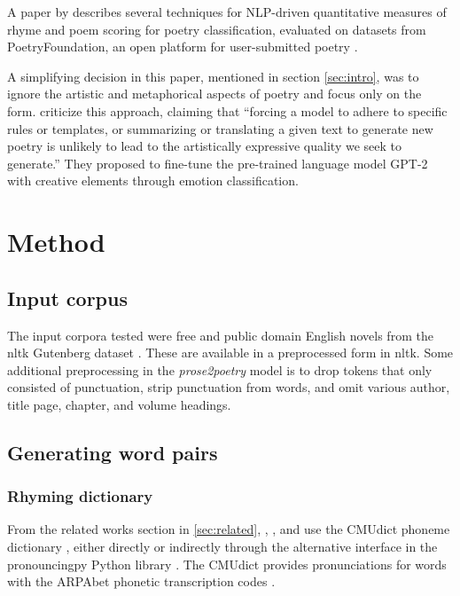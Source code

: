 \documentclass[11pt,a4paper]{article}
\begin{document}
A paper by \citet{keswarani} describes several techniques for NLP-driven quantitative measures of rhyme and poem scoring for poetry classification, evaluated on datasets from PoetryFoundation, an open platform for user-submitted poetry \cite*{poetryfoundation}.

A simplifying decision in this paper, mentioned in section \ref{sec:intro}, was to ignore the artistic and metaphorical aspects of poetry and focus only on the form. \citet{bena2020introducing} criticize this approach, claiming that ``forcing a model to adhere to specific rules or templates, or summarizing or translating a given text to generate new poetry is unlikely to lead to the artistically expressive quality we seek to generate.'' They proposed to fine-tune the pre-trained language model GPT-2 with creative elements through emotion classification.

\section{Method}
\label{sec:method}

\subsection{Input corpus}

The input corpora tested were free and public domain English novels from the nltk Gutenberg dataset \cite[Chapter~2]{gutenbergnltk}. These are available in a preprocessed form in nltk. Some additional preprocessing in the \textit{prose2poetry} model is to drop tokens that only consisted of punctuation, strip punctuation from words, and omit various author, title page, chapter, and volume headings.

\subsection{Generating word pairs}

\subsubsection{Rhyming dictionary}

From the related works section in \ref{sec:related}, \citet{keswarani}, \citet{cole}, and \citet{hopkins-kiela-2017} use the CMUdict phoneme dictionary \cite{cmudict}, either directly or indirectly through the alternative interface in the pronouncingpy Python library \cite{pronouncingpy}. The CMUdict provides pronunciations for words with the ARPAbet phonetic transcription codes \cite[Chapter~27]{jurafsky}.
\end{document}
